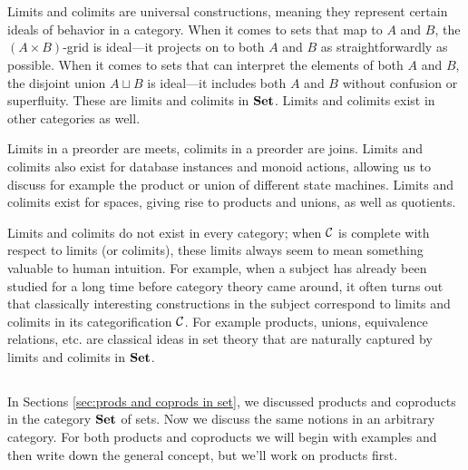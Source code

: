 

\section{}

Limits and colimits are universal constructions, meaning they represent certain ideals of behavior in a category. When it comes to sets that map to $A$ and $B$, the $(A\times B)$-grid is ideal—it projects on to both $A$ and $B$ as straightforwardly as possible. When it comes to sets that can interpret the elements of both $A$ and $B$, the disjoint union $A\sqcup B$ is ideal—it includes both $A$ and $B$ without confusion or superfluity. These are limits and colimits in ${\bf Set}$. Limits and colimits exist in other categories as well.

Limits in a preorder are meets, colimits in a preorder are joins. Limits and colimits also exist for database instances and monoid actions, allowing us to discuss for example the product or union of different state machines. Limits and colimits exist for spaces, giving rise to products and unions, as well as quotients.

Limits and colimits do not exist in every category; when $\mathcal{C}$ is complete with respect to limits (or colimits), these limits always seem to mean something valuable to human intuition. For example, when a subject has already been studied for a long time before category theory came around, it often turns out that classically interesting constructions in the subject correspond to limits and colimits in its categorification $\mathcal{C}$. For example products, unions, equivalence relations, etc. are classical ideas in set theory that are naturally captured by limits and colimits in ${\bf Set}$. 


\subsection{}

In Sections \ref{sec:prods and coprods in set}, we discussed products and coproducts in the category ${\bf Set}$ of sets. Now we discuss the same notions in an arbitrary category. For both products and coproducts we will begin with examples and then write down the general concept, but we'll work on products first.

